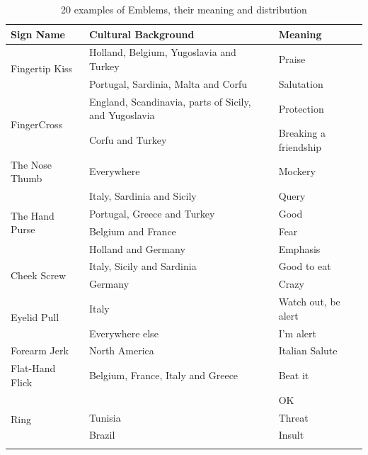 \begin{table}
    \centering
    \caption{\label{tab:Table_Emblems_Morris}20 examples of Emblems, their meaning and distribution}
    \begin{tabular}{|l|l|l|}
        \hline
        Sign Name       & Cultural Background   & Meaning   \\ \hline\hline
        \multirow{2}{*}{Fingertip Kiss} & Holland, Belgium, Yugoslavia and Turkey   & Praise\\ \cline{2-3} 
            & Portugal, Sardinia, Malta and Corfu   & Salutation    \\ \hline
        \multirow{2}{*}{FingerCross}    & England, Scandinavia, parts of Sicily, and Yugoslavia & Protection\\ \cline{2-3} 
            & Corfu and Turkey  & Breaking a friendship\\ \hline
            The Nose Thumb  & Everywhere    & Mockery\\ \hline
        \multirow{4}{*}{The Hand Purse} & Italy, Sardinia and Sicily    & Query\\ \cline{2-3} 
            & Portugal, Greece and Turkey   & Good\\ \cline{2-3} 
            & Belgium and France    & Fear\\ \cline{2-3} 
            & Holland and Germany   & Emphasis\\ \hline
        \multirow{2}{*}{Cheek Screw}    & Italy, Sicily and Sardinia    & Good to eat\\ \cline{2-3} 
            & Germany   & Crazy\\ \hline
        \multirow{2}{*}{Eyelid Pull}    & Italy & Watch out, be alert\\ \cline{2-3} 
            & Everywhere else   & I’m alert\\ \hline
        Forearm Jerk            & North America                                     & Italian Salute\\ \hline
        Flat-Hand Flick         & Belgium, France, Italy and Greece                 & Beat it\\ \hline
        \multirow{5}{*}{Ring}   &                                                   & OK\\ \cline{2-3} 
                                & Tunisia                                           & Threat\\ \cline{2-3} 
                                & Brazil                                            & Insult\\ \cline{2-3} 

\end{tabular}
\end{table}
